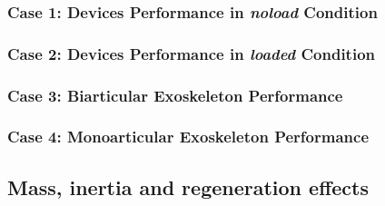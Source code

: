 \documentclass[10pt,letterpaper]{article}
\begin{document}
\subsubsection*{Case 1: Devices Performance in \textit{\textit{noload}} Condition} 
\subsubsection*{Case 2: Devices Performance in \textit{\textit{loaded}} Condition} 
\subsubsection*{Case 3: Biarticular Exoskeleton Performance} 
\subsubsection*{Case 4: Monoarticular Exoskeleton Performance}
\subsection*{Mass, inertia and regeneration effects}
\end{document}
